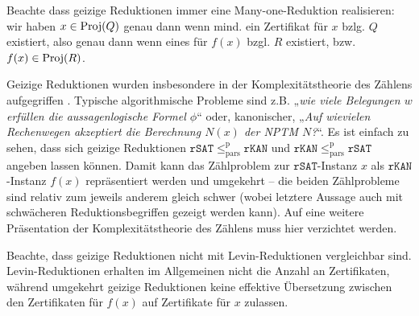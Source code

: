 Beachte dass geizige Reduktionen immer eine Many-one-Reduktion realisieren: wir haben $x\in\operatorname{Proj}(Q)$ genau dann wenn mind. ein Zertifikat für $x$ bzlg. $Q$ existiert, also genau dann wenn eines für $f(x)$ bzgl. $R$ existiert, bzw. $f(x)\in\operatorname{Proj}(R)$.

Geizige Reduktionen wurden insbesondere in der Komplexitätstheorie des Zählens aufgegriffen \parencites{simon_central_1975}{valiant_complexity_1979}. Typische algorithmische Probleme sind z.B. „\emph{wie viele Belegungen $w$ erfüllen die aussagenlogische Formel $\phi$}“ oder, kanonischer, „\emph{Auf wievielen Rechenwegen akzeptiert die Berechnung $N(x)$ der NPTM $N$?}“. Es ist einfach zu sehen, dass sich geizige Reduktionen $\mathtt{rSAT}\leq_\mathrm{pars}^\mathrm p \mathtt{rKAN}$ und $\mathtt{rKAN}\leq_\mathrm{pars}^\mathrm p \mathtt{rSAT}$ angeben lassen können. Damit kann das Zählproblem zur $\mathtt{rSAT}$-Instanz $x$ als $\mathtt{rKAN}$-Instanz $f(x)$ repräsentiert werden und umgekehrt -- die beiden Zählprobleme sind relativ zum jeweils anderem gleich schwer (wobei letztere Aussage auch mit schwächeren Reduktionsbegriffen gezeigt werden kann). Auf eine weitere Präsentation der Komplexitätstheorie des Zählens muss hier verzichtet werden.

Beachte, dass geizige Reduktionen nicht mit Levin-Reduktionen vergleichbar sind. Levin-Reduktionen erhalten im Allgemeinen nicht die Anzahl an Zertifikaten, während umgekehrt geizige Reduktionen keine effektive Übersetzung zwischen den Zertifikaten für $f(x)$ auf Zertifikate für $x$ zulassen.
%

